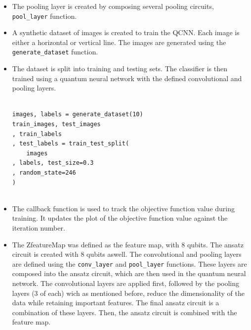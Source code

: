 \documentclass[conference]{IEEEtran}
\begin{document}
\begin{itemize}
{\small
\begin{verbatim}

def pool_circuit(params):
    target = QuantumCircuit(2)
    target.rz(-np.pi / 2, 1)
    target.cx(1, 0)
    target.rz(params[0], 0)
    target.ry(params[1], 1)
    target.cx(0, 1)
    target.ry(params[2], 1)
    return target

\end{verbatim}
}

    \item The pooling layer is created by composing several pooling circuits, \texttt{pool\_layer} function.\\

    
    \item A synthetic dataset of images is created to train the QCNN. Each image is either a horizontal or vertical line.
    The images are generated using the \texttt{generate\_dataset} function.\\


    \item The dataset is split into training and testing sets. The classifier is then trained using a quantum neural network with the defined convolutional and pooling layers.

{\small
\begin{verbatim}

images, labels = generate_dataset(10)
train_images, test_images
, train_labels
, test_labels = train_test_split(
    images
, labels, test_size=0.3
, random_state=246
)
    
\end{verbatim}
}

    \item The callback function is used to track the objective function value during training. It updates the plot of the objective function value against the iteration number.\\


    \item The ZfeatureMap was defined as the feature map, with 8 qubits. The ansatz circuit is created with 8 qubits aswell.     The convolutional and pooling layers are defined using the \texttt{conv\_layer} and \texttt{pool\_layer} functions. These layers are composed into the ansatz circuit, which are then used in the quantum neural network.
    The convolutional layers are applied first, followed by the pooling layers (3 of each) wich  as mentioned before, reduce the dimensionality of the data while retaining important features. The final ansatz circuit is a combination of these layers.
    Then, the ansatz circuit is combined with the feature map.\\




\end{itemize}
\end{document}

